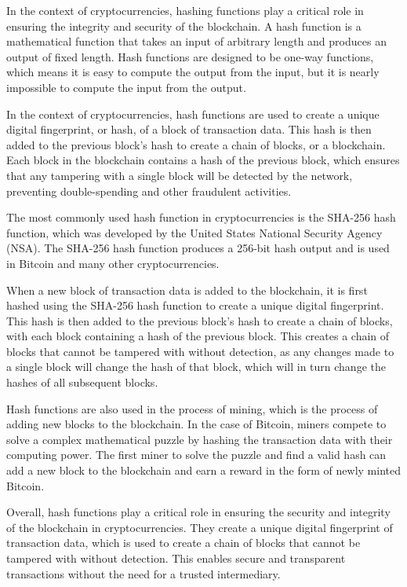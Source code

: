 \documentclass[a4paper, 10pt]{article}
\begin{document}
In the context of cryptocurrencies, hashing functions play a critical role in ensuring the integrity and security of the blockchain. A hash function is a mathematical function that takes an input of arbitrary length and produces an output of fixed length. Hash functions are designed to be one-way functions, which means it is easy to compute the output from the input, but it is nearly impossible to compute the input from the output.

In the context of cryptocurrencies, hash functions are used to create a unique digital fingerprint, or hash, of a block of transaction data. This hash is then added to the previous block's hash to create a chain of blocks, or a blockchain. Each block in the blockchain contains a hash of the previous block, which ensures that any tampering with a single block will be detected by the network, preventing double-spending and other fraudulent activities.

The most commonly used hash function in cryptocurrencies is the SHA-256 hash function, which was developed by the United States National Security Agency (NSA). The SHA-256 hash function produces a 256-bit hash output and is used in Bitcoin and many other cryptocurrencies.

When a new block of transaction data is added to the blockchain, it is first hashed using the SHA-256 hash function to create a unique digital fingerprint. This hash is then added to the previous block's hash to create a chain of blocks, with each block containing a hash of the previous block. This creates a chain of blocks that cannot be tampered with without detection, as any changes made to a single block will change the hash of that block, which will in turn change the hashes of all subsequent blocks.

Hash functions are also used in the process of mining, which is the process of adding new blocks to the blockchain. In the case of Bitcoin, miners compete to solve a complex mathematical puzzle by hashing the transaction data with their computing power. The first miner to solve the puzzle and find a valid hash can add a new block to the blockchain and earn a reward in the form of newly minted Bitcoin.

Overall, hash functions play a critical role in ensuring the security and integrity of the blockchain in cryptocurrencies. They create a unique digital fingerprint of transaction data, which is used to create a chain of blocks that cannot be tampered with without detection. This enables secure and transparent transactions without the need for a trusted intermediary.
\end{document}
